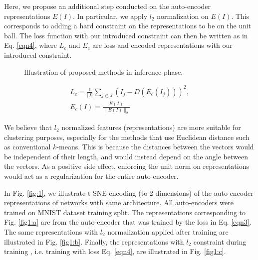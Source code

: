 \documentclass[conference]{IEEEtran}
\begin{document}
Here, we propose an additional step conducted on the auto-encoder representations $E(I)$. 
In particular, we apply $l_2$ normalization on $E(I)$. 
This corresponds to adding a hard constraint on the representations to be on the unit ball.
The loss function with our introduced constraint can then be written as in Eq. \ref{eqn4}, where $L_c$ and $E_c$ are loss and encoded representations with our introduced constraint.

\begin{figure*}

\centering
  \hfill
{}
  
\caption{Illustration of proposed methods in inference phase.}
\end{figure*}


\begin{equation}
\label{eqn4}
\begin{aligned}
L_c=\frac{1}{|J|}\sum_{j \in J} (I_j-D(E_c(I_j)))^2 ,\\
E_c(I)=\frac{E(I)}{\lVert E(I) \rVert_2}
\end{aligned}
\end{equation}


We believe that $l_2$ normalized features (representations) are more suitable for clustering purposes, especially for the methods that use Euclidean distance such as conventional $k$-means. 
This is because the distances between the vectors would be independent of their length, and would instead depend on the angle between the vectors. 
As a positive side effect, enforcing the unit norm on representations would act as a regularization for the entire auto-encoder.

In Fig. \ref{fig:1}, we illustrate t-SNE \cite{TSNE} encoding (to 2 dimensions) of the auto-encoder representations of networks with same architecture. 
All auto-encoders were trained on MNIST \cite{MNIST} dataset training split. 
The representations corresponding to Fig. \ref{fig1:a} are from the auto-encoder that was trained by the loss in Eq. \ref{eqn3}.
The same representations with $l_2$ normalization applied after training are illustrated in Fig. \ref{fig1:b}.
Finally, the representations with $l_2$ constraint during training , i.e. training with loss Eq. \ref{eqn4}, are illustrated in Fig. \ref{fig1:c}.
\end{document}
